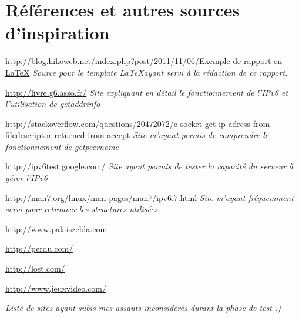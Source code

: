 \section*{Références et autres sources d'inspiration}

\url{http://blog.hikoweb.net/index.php?post/2011/11/06/Exemple-de-rapport-en-LaTeX} \linebreak
\emph{Source pour le template \LaTeX ayant servi à la rédaction de ce rapport.} \linebreak

\url{http://livre.g6.asso.fr/} \linebreak
\emph{Site expliquant en détail le fonctionnement de l'IPv6 et l'utilisation de getaddrinfo} \linebreak

\url{http://stackoverflow.com/questions/20472072/c-socket-get-ip-adress-from-filedescriptor-returned-from-accept} \linebreak
\emph{Site m'ayant permis de comprendre le fonctionnement de getpeername} \linebreak

\url{http://ipv6test.google.com/} \linebreak
\emph{Site ayant permis de tester la capacité du serveur à gérer l'IPv6} \linebreak

\url{http://man7.org/linux/man-pages/man7/ipv6.7.html} \linebreak
\emph{Site m'ayant fréquemment servi pour retrouver les structures utilisées.} \linebreak

\url{http://www.palaiszelda.com} \linebreak

\url{http://perdu.com/} \linebreak

\url{http://lost.com/} \linebreak

\url{http://www.jeuxvideo.com/} \linebreak

\emph{Liste de sites ayant subis mes assauts inconsidérés durant la phase de test :)} \linebreak

